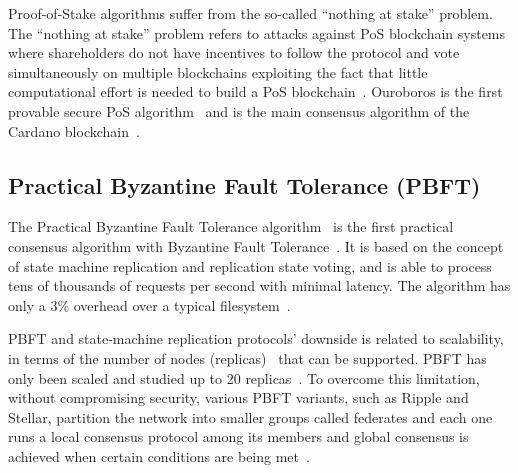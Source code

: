 Proof-of-Stake algorithms suffer from the so-called “nothing at stake” problem.
The “nothing at stake” problem refers to attacks against PoS blockchain systems where shareholders do not have
incentives to follow the protocol and vote simultaneously on multiple blockchains exploiting the fact that little computational effort
is needed to build a PoS blockchain~\cite{Kiayias2017}. Ouroboros is the first provable secure PoS algorithm~\cite{Kiayias2017} and is the main consensus algorithm of the Cardano blockchain~\cite{cardano_site}.

\subsection{Practical Byzantine Fault Tolerance (PBFT)}\label{blockchain:consensus:PBFT}

The Practical Byzantine Fault Tolerance algorithm~\cite{Castro:1999:PBF:296806.296824} is the first practical consensus algorithm with Byzantine Fault Tolerance~\cite{wiki:byzantine_fault_tolerance}.
It is based on the concept of state machine replication and replication state voting, and is able to process tens of thousands of requests per second with minimal latency.
The algorithm has only a 3\% overhead over a typical filesystem~\cite{Castro:1999:PBF:296806.296824}.

PBFT and state-machine replication protocols’ downside is related to scalability, in terms of the number of nodes (replicas)~\cite{Vukolić2016} that can be supported.
PBFT has only been scaled and studied up to 20 replicas~\cite{bl_consensus,Vukolić2016}. To overcome this limitation, without compromising security, various PBFT variants,
such as Ripple and Stellar, partition the network into smaller groups called federates and each one runs a local consensus protocol among its members and
global consensus is achieved when certain conditions are being met~\cite{DBLP:journals/corr/abs-1708-05665}.

